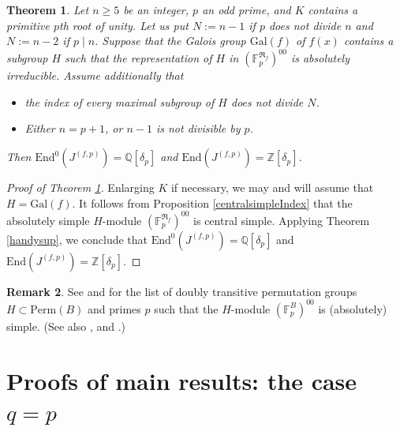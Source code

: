 \documentclass[12pt,a4paper,reqno]{amsart}
\def\Q{{\mathbb Q}}
\def\Z{{\mathbb Z}}
\def\R{{\mathbb R}}
\def\F{{\mathbb F}}
\def\R{{\mathfrak R}}
\def\Gal{\mathrm{Gal}}
\def\Perm{\mathrm{Perm}}
\def\End{\mathrm{End}}
\newtheorem{thm}{Theorem}[section]
\theoremstyle{definition}
\newtheorem{rem}[thm]{Remark}
\begin{document}
\begin{thm}
\label{SimpleDT}
Let $n \ge 5$ be an integer, $p$ an odd prime, and $K$ contains a primitive $p$th root of unity. 
 Let us put $N:=n-1$ if $p$ does not divide $n$ and $N:=n-2$ if $p\mid n$.
Suppose that the Galois group $\Gal(f)$ of $f(x)$ contains a subgroup $H$  such that the representation of $H$ in $(\F_p^{\R_f})^{00}$ is absolutely irreducible. 
Assume additionally that 
\begin{itemize}
\item[(i)]
the index of every maximal subgroup of  $H$  does not divide $N$.
\item[(ii)]
Either $n=p+1$,  or $n-1$ is not divisible by $p$.
\end{itemize}

Then $\End^0(J^{(f,p)})=\Q[\delta_p]$ and $\End(J^{(f,p)})=\Z[\delta_p]$.
\end{thm}

\begin{proof}
[Proof of Theorem \ref{SimpleDT}]
Enlarging $K$ if necessary, we may and will assume that $H=\Gal(f)$. It follows from Proposition \ref{centralsimpleIndex} that
the  absolutely simple $H$-module $(\F_p^{\R_f})^{00}$ is central simple.
Applying Theorem \ref{handysup}, we conclude that
$\End^0(J^{(f,p)})=\Q[\delta_p]$ and $\End(J^{(f,p)})=\Z[\delta_p]$.
\end{proof}

\begin{rem}
See \cite[Sect. 7.7]{DM} and \cite{Mortimer} for the list of doubly transitive permutation groups $H\subset \Perm(B)$  and primes $p$ such that the $H$-module
$(\F_p^{B})^{00}$ is (absolutely) simple. (See also \cite[Sect. 4]{PraegerS}, \cite[Main Theorem]{Curtis}
and \cite{KT}.)
\end{rem}

\section{Proofs of main results: the case $q=p$}
\label{mainPproof}
\end{document}
